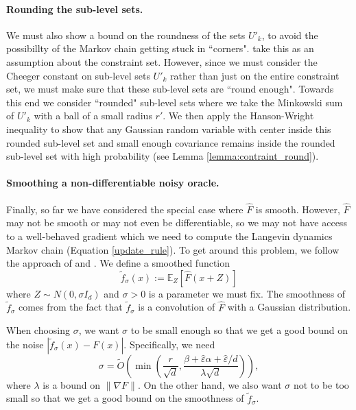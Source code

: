 \documentclass[final,12pt]{colt2018} %
\begin{document}
{\paragraph{Rounding the sub-level sets.}
We must also show a bound on the roundness of the sets $U'_k$, to avoid the possibillty of the Markov chain getting stuck in ``corners". 
%
  \cite{hitting_times} take this as an assumption about the constraint set.  
 However, since we must consider the Cheeger constant on sub-level sets $U'_k$ rather than just on the entire constraint set, we must make sure that these sub-level sets are ``round enough".  
 Towards this end we consider ``rounded" sub-level sets where we take the Minkowski sum of $U'_k$ with a ball of a small radius $r'$.  
 We then apply the Hanson-Wright inequality to show that any Gaussian random variable with center inside this rounded sub-level set and small enough covariance  remains inside the rounded sub-level set with high probability (see Lemma \ref{lemma:contraint_round}).

\vspace{-2mm}
\paragraph{Smoothing a non-differentiable noisy oracle.}  Finally, so far we  have considered the special case where $\hat{F}$ is smooth.
%
  However, $\hat{F}$ may not be smooth or may not even be differentiable, so we may not have access to a well-behaved gradient which we need to compute the Langevin dynamics Markov chain (Equation \ref{update_rule}).  
  To get around this problem, we follow the approach of \cite{duchi2015optimal} and \cite{hitting_times}. 
   We define a smoothed function
$$
\tilde{f}_\sigma(x) := \mathbb{E}_Z[\hat{F}(x+Z)]
$$
where $Z \sim N(0, \sigma I_d)$ and $\sigma>0$ is a parameter we must fix.  
%
The smoothness of  $\tilde{f}_\sigma$ comes from the fact that $\tilde{f}_\sigma$ is a convolution of $\hat{F}$ with a Gaussian distribution.

When choosing $\sigma$, we want $\sigma$ to be small enough so that we get a good bound on the noise $|\tilde{f}_\sigma(x)-F(x)|$. 
%
 Specifically, we need 
 $$\sigma = \tilde{O}\left(\min\left(\frac{r}{\sqrt{d}}, \frac{\beta +\hat{\varepsilon}\alpha +\hat{\varepsilon}/d}{\lambda\sqrt{d}}\right)\right),$$ where $\lambda$ is a bound on $\|\nabla F\|$.  
 On the other hand, we also want $\sigma$ not to be too small so that we get a good bound on the smoothness of $\tilde{f}_\sigma$.

}
\end{document}

